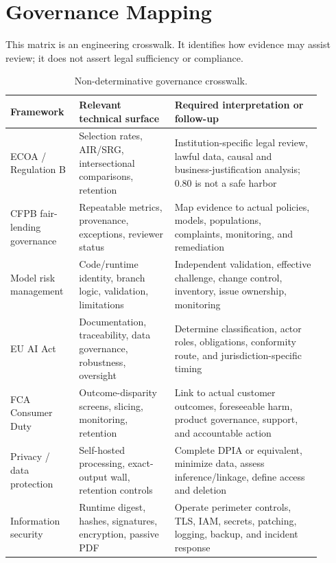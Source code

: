 \section{Governance Mapping}
\label{app:regulatory}

This matrix is an engineering crosswalk. It identifies how evidence may assist review; it does not
assert legal sufficiency or compliance.

\begin{table}[htbp]
\centering
\scriptsize
\AccessibleTableHeaderRow
\begin{tabular}{@{}>{\RaggedRight\arraybackslash}p{0.18\linewidth}
                    >{\RaggedRight\arraybackslash}p{0.29\linewidth}
                    >{\RaggedRight\arraybackslash}p{0.43\linewidth}@{}}
\toprule
Framework & Relevant technical surface & Required interpretation or follow-up \\
\midrule
ECOA / Regulation B & Selection rates, AIR/SRG, intersectional comparisons, retention & Institution-specific legal review, lawful data, causal and business-justification analysis; 0.80 is not a safe harbor \\
CFPB fair-lending governance & Repeatable metrics, provenance, exceptions, reviewer status & Map evidence to actual policies, models, populations, complaints, monitoring, and remediation \\
Model risk management & Code/runtime identity, branch logic, validation, limitations & Independent validation, effective challenge, change control, inventory, issue ownership, monitoring \\
EU AI Act & Documentation, traceability, data governance, robustness, oversight & Determine classification, actor roles, obligations, conformity route, and jurisdiction-specific timing \\
FCA Consumer Duty & Outcome-disparity screens, slicing, monitoring, retention & Link to actual customer outcomes, foreseeable harm, product governance, support, and accountable action \\
Privacy / data protection & Self-hosted processing, exact-output wall, retention controls & Complete DPIA or equivalent, minimize data, assess inference/linkage, define access and deletion \\
Information security & Runtime digest, hashes, signatures, encryption, passive PDF & Operate perimeter controls, TLS, IAM, secrets, patching, logging, backup, and incident response \\
\bottomrule
\end{tabular}
\caption{Non-determinative governance crosswalk.}
\label{tab:regulatory-matrix}
\end{table}
